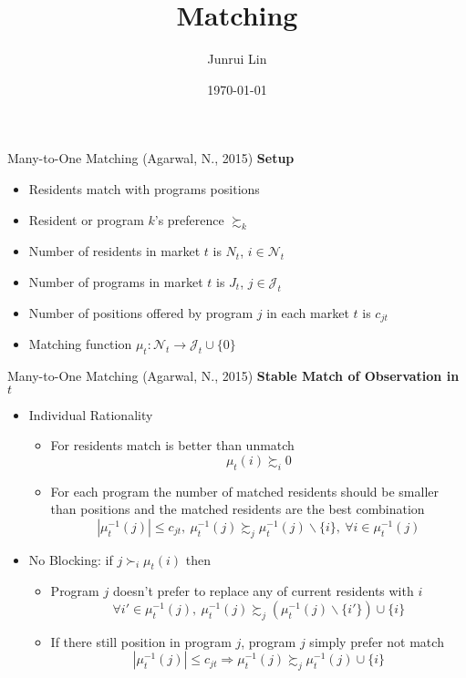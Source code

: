 \documentclass[10pt]{beamer}
\title[NYU MSQE]{Matching}
\author[Junrui Lin]{Junrui Lin}
\institute[jl12680]{NYU MSQE}
\date[\textcolor{white}{\today} ]
{\today}
\begin{document}
\frame{\titlepage}


\begin{frame}{Many-to-One Matching (Agarwal, N., 2015)}
\textbf{Setup}
\begin{itemize}
\item Residents match with programs positions
\item Resident or program $k$'s preference $\succsim_k$
\item Number of residents in market $t$ is $N_t$, $i\in\mathcal{N}_t$
\item Number of programs in market $t$ is $J_t$,  $j\in\mathcal{J}_t$
\item Number of positions offered by program $j$ in each market $t$ is $c_{jt}$
\item Matching function $\mu_t: \mathcal{N}_t\to \mathcal{J}_t\cup \{0\}$
\end{itemize}
\end{frame}

\begin{frame}{Many-to-One Matching (Agarwal, N., 2015)}
\textbf{Stable Match of Observation in $t$}
\begin{itemize}
\item Individual Rationality\begin{itemize}
\item For residents match is better than unmatch $$\mu_t(i) \succsim_i 0$$
\item For each program the number of matched residents should be smaller than positions and the matched residents are the best combination  $$|\mu_t^{-1}(j)| \leq c_{jt},\ \mu_t^{−1}(  j) \succsim_j \mu_t^{−1}(  j)\backslash\{i\} ,\ \forall i \in \mu_t^{−1}(  j)$$
 \end{itemize}
\item No Blocking: if $j \succ_i \mu_t(i)$ then
\begin{itemize}
\item Program $j$ doesn't prefer to replace any of current residents with $i$
$$\forall i'\in \mu_t^{−1}(  j),\ \mu_t^{−1}(  j)\succsim_j(\mu_t^{−1}(  j)\backslash\{i'\})\cup\{i\}$$
\item If there still position in program $j$, program $j$ simply prefer not match
$$|\mu_t^{-1}(j)| \leq c_{jt}\Rightarrow \mu_t^{-1}(j)\succsim_j\mu_t^{-1}(j)\cup\{i\}$$
\end{itemize}
\end{itemize}
\end{frame}
\end{document}

